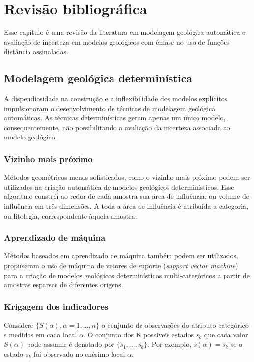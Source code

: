 \chapter{Revisão bibliográfica}

Esse capítulo é uma revisão da literatura em modelagem geológica automática e avaliação de incerteza em modelos geológicos com ênfase no uso de funções distância assinaladas.

\section{Modelagem geológica determinística}

A dispendiosidade na construção e a inflexibilidade dos modelos explícitos impulsionaram o desenvolvimento de técnicas de modelagem geológica automáticas. As técnicas determinísticas geram apenas um único modelo, consequentemente, não possibilitando a avaliação da incerteza associada ao modelo geológico. 

\subsection{Vizinho mais próximo}

Métodos geométricos menos sofisticados, como o vizinho mais próximo podem ser utilizados na criação automática de modelos geológicos determinísticos. Esse algoritmo constrói ao redor de cada amostra sua área de influência, ou volume de influência em três dimensões. A toda a área de influência é atribuída a categoria, ou litologia, correspondente àquela amostra. 

\subsection{Aprendizado de máquina}

Métodos baseados em aprendizado de máquina também podem ser utilizados.  propuseram o uso de máquina de vetores de suporte (\textit{support vector machine}) para a criação de modelos geológicos determinísticos multi-categóricos a partir de amostras esparsas de diferentes origens.

\subsection{Krigagem dos indicadores}\label{ik}

Considere $\{S(\alpha), \alpha=1,...,n\}$ o conjunto de observações do atributo categórico s medidos em cada local $\alpha$. O conjunto dos K possíveis estados $s_{k}$ que cada valor $S(\alpha)$ pode assumir é denotado por $\{s_{1}, ..., s_{k}\}$. Por exemplo, $s(\alpha)=s_{k}$ se o estado $s_{k}$ foi observado no enésimo local $\alpha$.

